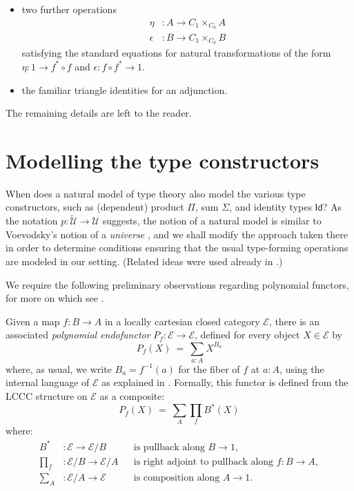 \documentclass[12pt]{article}
\newcommand{\CC}{\ensuremath{\mathcal{E}}}
\newcommand{\Id}{\mathsf{Id}}
\newcommand{\U}{\ensuremath{\mathcal{U}}}
\newcommand{\UU}{\ensuremath{\widetilde{\mathcal{U}}}}
\theoremstyle{definition}
\begin{document}
\begin{description}
\begin{itemize}
\item two further operations 
\begin{align*}
\eta &: A \to C_1 \times_{C_0} A \\
\epsilon &: B \to C_1 \times_{C_0} B 
\end{align*}
satisfying the standard equations for natural transformations of the form $\eta: 1 \to f^*\circ f$ and $\epsilon: f\circ f^*\to 1$.
\item the familiar triangle identities for an adjunction.
\end{itemize}
The remaining details are left to the reader.
\end{description}

\section{Modelling the type constructors}\label{sec:modelling}

When does a natural model of type theory also model the various type constructors, such as (dependent) product $\Pi$, sum $\Sigma$, and identity types $\Id$? As the notation $p : \UU\to\U$ suggests, the notion of a natural model is similar to Voevodsky's notion of a \emph{universe} \cite{KLV}, and we shall modify the approach taken there in order to determine conditions ensuring that the usual type-forming operations are modeled in our setting. (Related ideas were used already in \cite{Fu, StreicherUp}.)

We require the following preliminary observations regarding polynomial functors, for more on which see \cite{GK}.  

Given a map $f : B \to A$  in a locally cartesian closed category $\CC$, there is an associated \emph{polynomial endofunctor} $P_f : \CC \to \CC$,
defined for every object $X\in\CC$ by
\begin{equation}\label{eq:polydef}
P_f(X)\ =\ \sum_{a:A}X^{B_a}
\end{equation}
where, as usual, we write $B_a = f^{-1}(a)$ for the fiber of $f$ at $a:A$, using the internal language of $\CC$ as explained in \cite{GK}.  Formally, this functor is defined from the LCCC structure on $\CC$ as a composite:
\[
P_f(X)\ =\ \sum_{A}\prod_{f}B^{*}(X)
\]
where:
\begin{align*}
B^* &: \CC \to \CC/B && \text{is pullback along $B\to 1$},\\
\prod_{f} &: \CC/B \to \CC/A && \text{is right adjoint to pullback along $f : B\to A$},\\
\sum_{A} &: \CC/A \to \CC && \text{is composition along $A\to 1$}.
\end{align*}
\end{document}
